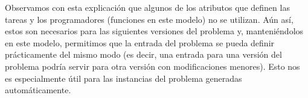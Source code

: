 Observamos con esta explicación que algunos de los atributos que definen las 
tareas y los programadores (funciones en este modelo) no se utilizan. Aún así, 
estos son necesarios para las siguientes versiones del problema y, 
manteniéndolos en este modelo, permitimos que la entrada del problema se pueda 
definir prácticamente del mismo modo (es decir, una entrada para una versión 
del problema podría servir para otra versión con modificaciones menores). 
Esto nos es especialmente útil para las instancias del problema generadas 
automáticamente.



